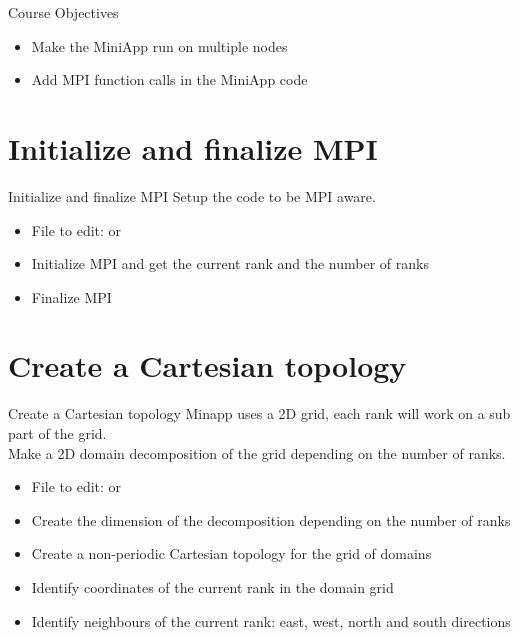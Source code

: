 \documentclass[aspectratio=43]{beamer}
\begin{document}
\cscstitle

\begin{frame}{Course Objectives}
\begin{itemize}
\item Make the MiniApp run on multiple nodes
\item Add MPI function calls in the MiniApp code
\end{itemize}
\end{frame}



\section{Initialize and finalize MPI}
\begin{frame}[fragile]{Initialize and finalize MPI}
Setup the code to be MPI aware.
\begin{itemize}
\item File to edit:  or 
\item Initialize MPI and get the current rank and the number of ranks
\item Finalize MPI
\end{itemize}
\end{frame}

\section{Create a Cartesian topology}
\begin{frame}[fragile]{Create a Cartesian topology}
Minapp uses a 2D grid, each rank will work on a sub part of the grid.\\
Make a 2D domain decomposition of the grid depending on the number of ranks.\\
\begin{itemize}
\item File to edit:  or 
\item Create the dimension of the decomposition depending on the number of ranks
\item Create a non-periodic Cartesian topology for the grid of domains
\item Identify coordinates of the current rank in the domain grid
\item Identify neighbours of the current rank: east, west, north and south directions
\end{itemize}
\end{frame}
\end{document}
